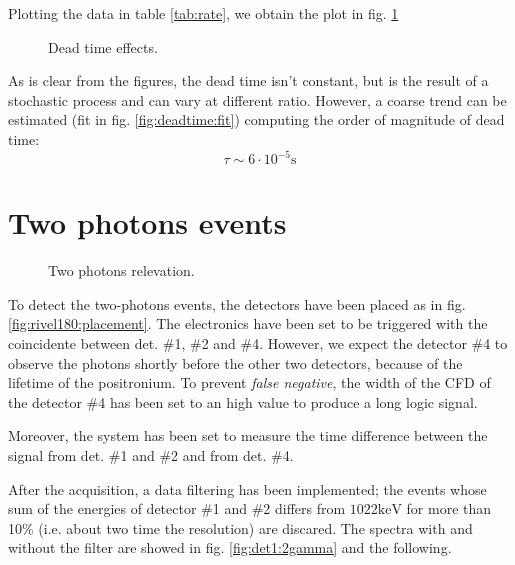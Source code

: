 \documentclass[11pt,a4 paper]{article}
\begin{document}
Plotting the data in table \ref{tab:rate}, we obtain the plot in fig. \ref{fig:deadtime}

\begin{figure}[H]
    \centering
     \quad
    \caption{Dead time effects.}
    \label{fig:deadtime}
\end{figure}

As is clear from the figures, the dead time isn't constant, but is the result of a stochastic process and can vary at different ratio. However, a coarse trend can be estimated (fit in fig. \ref{fig:deadtime:fit}) computing the order of magnitude of dead time:
\begin{equation}
    \tau \sim 6\cdot10^{-5} \si{\second}
\end{equation}
\section{Two photons events}

\begin{figure}[H]
    \centering
     \quad
    \caption{Two photons relevation.}
    \label{fig:rivel180}
\end{figure}

To detect the two-photons events, the detectors have been placed as in fig. \ref{fig:rivel180:placement}. The electronics have been set to be triggered with the coincidente between det. \#1, \#2 and \#4. However, we expect the detector \#4 to observe the photons shortly before the other two detectors, because of the lifetime of the positronium. To prevent \emph{false negative}, the width of the CFD of the detector \#4 has been set to an high value to produce a long logic signal.

Moreover, the system has been set to measure the time difference between the signal from det. \#1 and \#2 and from det. \#4.

After the acquisition, a data filtering has been implemented; the events whose sum of the energies of detector \#1 and \#2 differs from $1022\si{\kilo\electronvolt}$ for more than 10\% (i.e. about two time the resolution) are discared. The spectra with and without the filter are showed in fig. \ref{fig:det1:2gamma} and the following.
\end{document}
